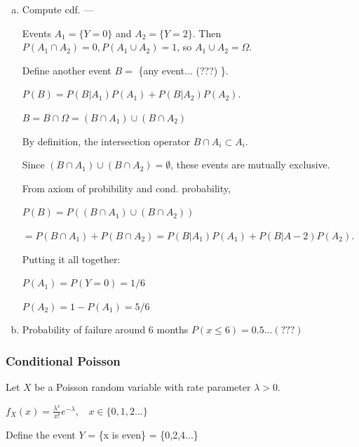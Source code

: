 \documentclass{report}
\begin{document}
\begin{enumerate}[(a)]
\item Compute cdf.
---

Events $A_1 = \{Y=0\}$ and $A_2 = \{Y=2\}$. Then  $P(A_1 \cap A_2) = 0, P(A_1 \cup A_2) = 1$, so $A_1 \cup A_2 = \Omega$.

Define another event $B = $ \{any event... (???) \}.

$P(B) = P(B|A_1) P(A_1) + P(B|A_2)P(A_2)$. 

$B = B \cap \Omega = (B \cap A_1) \cup (B \cap A_2)$

By definition, the intersection operator $B \cap A_i \subset A_i$.

Since $(B \cap A_1) \cup (B \cap A_2) = \emptyset$, these events are mutually exclusive.

From axiom of probibility and cond. probability, 

$P(B) = P( (B \cap A_1) \cup (B \cap A_2) ) $ 

$= P(B \cap A_1) + P(B \cap A_2) = P(B|A_1)P(A_1) + P(B|A-2)P(A_2)$.

Putting it all together:

$P(A_1) = P(Y=0) = 1/6$

$P(A_2) = 1-P(A_1) = 5/6$

\item Probability of failure around 6 months $P(x \leq 6) = 0.5 ... (???)$

 
\end{enumerate}

\subsubsection{Conditional Poisson}

Let $X$ be a Poisson random variable with rate parameter $\lambda > 0$. 

$f_X(x) = \frac{\lambda^x}{x!}e^{-\lambda}, \ \ \ \ x \in \{0,1,2...\}$

Define the event $Y$ = \{x is even\} = \{0,2,4...\}
\end{document}
